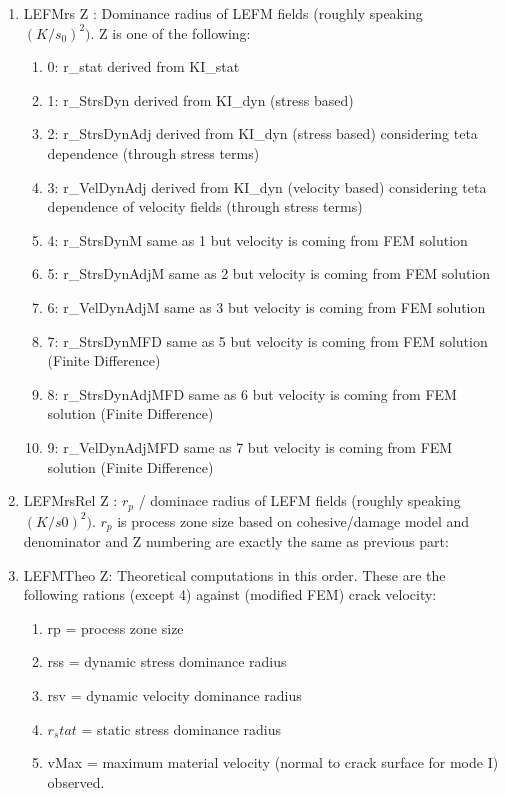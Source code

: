 \documentclass[10pt]{article}
\begin{document}
\begin{enumerate}
		\item LEFMrs	Z		:	Dominance radius of LEFM fields (roughly speaking ~ $(K / s_0)^2)$. Z is one of the following:	
		\begin{enumerate}
			\item 0:	r\_stat			derived from KI\_stat
			\item 1:	r\_StrsDyn			derived from KI\_dyn (stress based)
			\item 2:	r\_StrsDynAdj		derived from KI\_dyn (stress based) considering teta dependence (through stress terms)
			\item 3:	r\_VelDynAdj			derived from KI\_dyn (velocity based) considering teta dependence of velocity fields (through stress terms)
			\item 4:	r\_StrsDynM			same as 1 but velocity is coming from FEM solution
			\item 5:	r\_StrsDynAdjM		same as 2 but velocity is coming from FEM solution
			\item 6:	r\_VelDynAdjM		same as 3 but velocity is coming from FEM solution
			\item 7:	r\_StrsDynMFD		same as 5 but velocity is coming from FEM solution (Finite Difference)
			\item 8:	r\_StrsDynAdjMFD		same as 6 but velocity is coming from FEM solution (Finite Difference)
			\item 9:	r\_VelDynAdjMFD		same as 7 but velocity is coming from FEM solution (Finite Difference)
		\end{enumerate}
		\item LEFMrsRel	Z	:		$r_p$ / dominace radius of LEFM fields (roughly speaking ~ $(K / s0)^2)$. $r_p$ is process zone size based on cohesive/damage model and denominator and Z numbering are exactly the same as previous part:
				\item LEFMTheo	Z:			Theoretical computations in this order. These are the following rations (except 4) against (modified FEM) crack velocity: 
		\begin{enumerate}
			\item rp = process zone size
			\item rss = dynamic stress dominance radius
			\item rsv = dynamic velocity dominance radius
			\item $r_stat$ = static stress dominance radius
			\item vMax = maximum material velocity (normal to crack surface for mode I) observed.
			\end{enumerate}

\end{enumerate}
\end{document}
